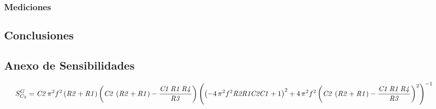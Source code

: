 \subsubsection{Mediciones}


\subsection{Conclusiones}

\subsection{Anexo de Sensibilidades}
\begin{equation}
S^{G}_{C_2}={{\it C2}\,{\pi }^{2}\\
\mbox{}{f}^{2} \left( {\it R2}+{\it R1} \right)  \left( {\it C2}\, \left( {\it R2}+{\it R1} \right) -{\frac {{\it C1}\,{\it R1}\,{\it R4}}{{\it R3}}}\\
\mbox{} \right)  \left(  \left( -4\,{\pi }^{2}{f}^{2}{\it R2R1C2C1}+1 \right) ^{2}+4\,{\pi }^{2}{f}^{2} \left( {\it C2}\, \left( {\it R2}+{\it R1} \right) -{\frac {{\it C1}\,{\it R1}\,{\it R4}}{{\it R3}}} \right) ^{2} \right) ^{-1}}
\end{equation}
